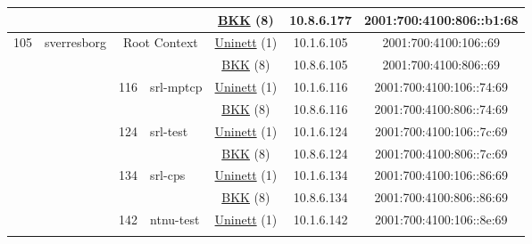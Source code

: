 \begin{small}
\begin{center}
\begin{longtable}{|c|c|c|c|c|c|c|c|}
  &  &  &  & \multicolumn{2}{|c|}{\tiny{\href{http://bkk.no}{BKK} (8)}} & \tiny{10.8.6.177} & \tiny{2001:700:4100:806::b1:68} \\ \hline
 \multirow{24}{*}{\tiny{105}} & \multicolumn{1}{|l|}{\multirow{24}{*}{\tiny{sverresborg}}} & \multicolumn{2}{|c|}{\multirow{2}{*}{\tiny{Root Context}}} & \multicolumn{2}{|c|}{\tiny{\href{https://www.uninett.no}{Uninett} (1)}} & \tiny{10.1.6.105} & \tiny{2001:700:4100:106::69} \\* \cline{5-5}\cline{6-6}\cline{7-7}\cline{8-8}
  &  & \multicolumn{2}{|c|}{} & \multicolumn{2}{|c|}{\tiny{\href{http://bkk.no}{BKK} (8)}} & \tiny{10.8.6.105} & \tiny{2001:700:4100:806::69} \\* \cline{3-3}\cline{4-4}\cline{5-5}\cline{6-6}\cline{7-7}\cline{8-8}
  &  & \multirow{2}{*}{\tiny{116}} & \multicolumn{1}{|l|}{\multirow{2}{*}{\tiny{srl-mptcp}}} & \multicolumn{2}{|c|}{\tiny{\href{https://www.uninett.no}{Uninett} (1)}} & \tiny{10.1.6.116} & \tiny{2001:700:4100:106::74:69} \\* \cline{5-5}\cline{6-6}\cline{7-7}\cline{8-8}
  &  &  &  & \multicolumn{2}{|c|}{\tiny{\href{http://bkk.no}{BKK} (8)}} & \tiny{10.8.6.116} & \tiny{2001:700:4100:806::74:69} \\* \cline{3-3}\cline{4-4}\cline{5-5}\cline{6-6}\cline{7-7}\cline{8-8}
  &  & \multirow{2}{*}{\tiny{124}} & \multicolumn{1}{|l|}{\multirow{2}{*}{\tiny{srl-test}}} & \multicolumn{2}{|c|}{\tiny{\href{https://www.uninett.no}{Uninett} (1)}} & \tiny{10.1.6.124} & \tiny{2001:700:4100:106::7c:69} \\* \cline{5-5}\cline{6-6}\cline{7-7}\cline{8-8}
  &  &  &  & \multicolumn{2}{|c|}{\tiny{\href{http://bkk.no}{BKK} (8)}} & \tiny{10.8.6.124} & \tiny{2001:700:4100:806::7c:69} \\* \cline{3-3}\cline{4-4}\cline{5-5}\cline{6-6}\cline{7-7}\cline{8-8}
  &  & \multirow{2}{*}{\tiny{134}} & \multicolumn{1}{|l|}{\multirow{2}{*}{\tiny{srl-cps}}} & \multicolumn{2}{|c|}{\tiny{\href{https://www.uninett.no}{Uninett} (1)}} & \tiny{10.1.6.134} & \tiny{2001:700:4100:106::86:69} \\* \cline{5-5}\cline{6-6}\cline{7-7}\cline{8-8}
  &  &  &  & \multicolumn{2}{|c|}{\tiny{\href{http://bkk.no}{BKK} (8)}} & \tiny{10.8.6.134} & \tiny{2001:700:4100:806::86:69} \\* \cline{3-3}\cline{4-4}\cline{5-5}\cline{6-6}\cline{7-7}\cline{8-8}
  &  & \multirow{2}{*}{\tiny{142}} & \multicolumn{1}{|l|}{\multirow{2}{*}{\tiny{ntnu-test}}} & \multicolumn{2}{|c|}{\tiny{\href{https://www.uninett.no}{Uninett} (1)}} & \tiny{10.1.6.142} & \tiny{2001:700:4100:106::8e:69} \\* \cline{5-5}\cline{6-6}\cline{7-7}\cline{8-8}

\end{longtable}
\end{center}
\end{small}

